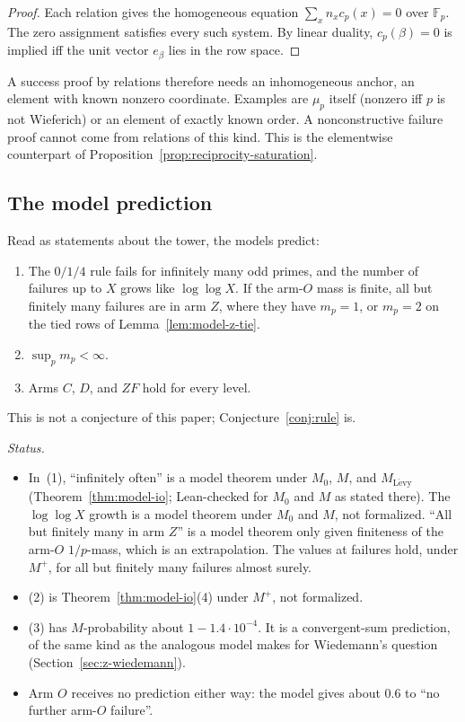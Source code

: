 \begin{proof}
Each relation gives the homogeneous equation $\sum_xn_xc_p(x)=0$ over
$\mathbb F_p$.  The zero assignment satisfies every such system.  By linear
duality, $c_p(\beta)=0$ is implied iff the unit vector $e_\beta$ lies in the
row space.
\end{proof}

A success proof by relations therefore needs an inhomogeneous anchor, an
element with known nonzero coordinate.  Examples are $\mu_p$ itself (nonzero
iff $p$ is not Wieferich) or an element of exactly known order.  A
nonconstructive failure proof cannot come from relations of this kind.  This
is the elementwise counterpart of Proposition~\ref{prop:reciprocity-saturation}.

\subsection{The model prediction}\label{sec:model-prediction}

\begin{remark}\label{rem:model-prediction}
Read as statements about the tower, the models predict:
\begin{enumerate}
\item The $0/1/4$ rule fails for infinitely many odd primes, and the number
      of failures up to $X$ grows like $\log\log X$.  If the arm-$O$ mass is
      finite, all but finitely many failures are in arm $Z$, where they have
      $m_p=1$, or $m_p=2$ on the tied rows of Lemma~\ref{lem:model-z-tie}.
\item $\sup_pm_p<\infty$.
\item Arms $C$, $D$, and $ZF$ hold for every level.
\end{enumerate}
This is not a conjecture of this paper; Conjecture~\ref{conj:rule} is.
\end{remark}

\noindent\emph{Status.}
\begin{itemize}
\item In~(1), ``infinitely often'' is a model theorem under $M_0$, $M$, and
      $M_{\mathrm{L\acute evy}}$ (Theorem~\ref{thm:model-io}; Lean-checked
      for $M_0$ and $M$ as stated there).  The $\log\log X$ growth is a model
      theorem under $M_0$ and $M$, not formalized.  ``All but finitely many in
      arm $Z$'' is a model theorem only given finiteness of the arm-$O$
      $1/p$-mass, which is an extrapolation.  The values at failures hold,
      under $M^+$, for all but finitely many failures almost surely.
\item (2) is Theorem~\ref{thm:model-io}(4) under $M^+$, not formalized.
\item (3) has $M$-probability about $1-1.4\cdot10^{-4}$.  It is a
      convergent-sum prediction, of the same kind as the analogous model
      makes for Wiedemann's question (Section~\ref{sec:z-wiedemann}).
\item Arm $O$ receives no prediction either way: the model gives about $0.6$
      to ``no further arm-$O$ failure''.
\end{itemize}

